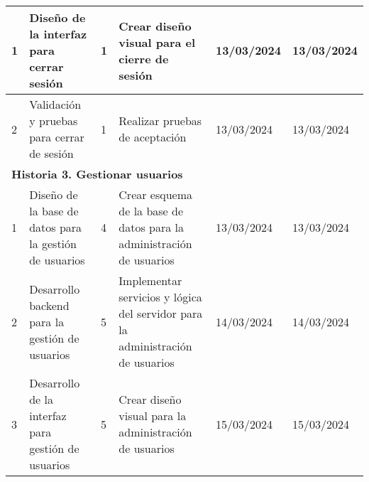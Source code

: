 \begin{longtable}{|p{0.5cm}|p{2cm}|p{1cm}|p{3cm}|p{1cm}|p{1cm}|}
    1                                        & Diseño de la interfaz para cerrar sesión                 & 1                                                              & Crear diseño visual para el cierre de sesión                                   & 13/03/2024                                                    & 13/03/2024                                                          \\ \hline
    2                                        & Validación y pruebas para cerrar de sesión               & 1                                                              & Realizar pruebas de aceptación                                                 & 13/03/2024                                                    & 13/03/2024                                                          \\ \hline
    \multicolumn{6}{|l|}{\textbf{Historia 3. Gestionar usuarios}}                                                                                                                                                                                                                                                                                                                               \\ \hline
    1                                        & Diseño de la base de datos para la gestión de usuarios   & 4                                                              & Crear esquema de la base de datos para la administración de usuarios           & 13/03/2024                                                    & 13/03/2024                                                          \\ \hline
    2                                        & Desarrollo backend para la gestión de usuarios           & 5                                                              & Implementar servicios y lógica del servidor para la administración de usuarios & 14/03/2024                                                    & 14/03/2024                                                          \\ \hline
    3                                        & Desarrollo de la interfaz para gestión de usuarios       & 5                                                              & Crear diseño visual para la administración de usuarios                         & 15/03/2024                                                    & 15/03/2024                                                          \\ \hline

\end{longtable}
